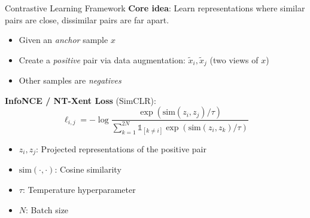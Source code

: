 \documentclass[11pt]{beamer}
\begin{document}
\begin{frame}{Contrastive Learning Framework}
    \textbf{Core idea}: Learn representations where similar pairs are close, dissimilar pairs are far apart.
    \vspace{0.5em}
    \begin{itemize}
        \item Given an \emph{anchor} sample $x$
        \item Create a \emph{positive} pair via data augmentation: $\tilde{x}_i, \tilde{x}_j$ (two views of $x$)
        \item Other samples are \emph{negatives}
    \end{itemize}
    \vfill
    \textbf{InfoNCE / NT-Xent Loss} (SimCLR):
    \[
        \ell_{i,j} = -\log \frac{\exp(\text{sim}(z_i, z_j)/\tau)}{\sum_{k=1}^{2N} \mathbb{1}_{[k \neq i]} \exp(\text{sim}(z_i, z_k)/\tau)}
    \]
    \begin{itemize}
        \item $z_i, z_j$: Projected representations of the positive pair
        \item $\text{sim}(\cdot, \cdot)$: Cosine similarity
        \item $\tau$: Temperature hyperparameter
        \item $N$: Batch size
    \end{itemize}
\end{frame}
\end{document}
